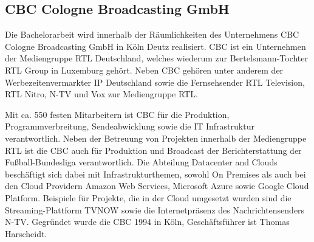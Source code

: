 \subsection{CBC Cologne Broadcasting GmbH}

Die Bachelorarbeit wird innerhalb der Räumlichkeiten des Unternehmens CBC Cologne Broadcasting GmbH in Köln Deutz realisiert.
CBC ist ein Unternehmen der Mediengruppe RTL Deutschland, welches wiederum zur Bertelsmann-Tochter RTL Group in Luxemburg gehört.
Neben CBC gehören unter anderem der Werbezeitenvermarkter IP Deutschland sowie die Fernsehsender RTL Television, RTL Nitro, N-TV und Vox zur Mediengruppe RTL.


Mit ca. 550 festen Mitarbeitern ist CBC für die Produktion, Programmverbreitung, Sendeabwicklung sowie die IT Infrastruktur verantwortlich.
Neben der Betreuung von Projekten innerhalb der Mediengruppe RTL ist die CBC auch für Produktion und Broadcast der Berichterstattung der Fußball-Bundesliga verantwortlich.
Die Abteilung Datacenter and Clouds beschäftigt sich dabei mit Infrastrukturthemen, sowohl On Premises als auch bei den Cloud Providern Amazon Web Services, Microsoft Azure sowie Google Cloud Platform.
Beispiele für Projekte, die in der Cloud umgesetzt wurden sind die Streaming-Plattform TVNOW sowie die Internetpräsenz des Nachrichtensenders N-TV.
Gegründet wurde die CBC 1994 in Köln, Geschäftsführer ist Thomas Harscheidt.
